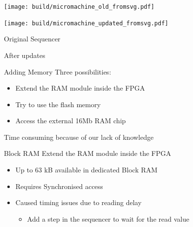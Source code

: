 \documentclass{beamer}
\begin{document}
      \begin{landscape}
        \begin{frame}[plain]
            \texttt{[image: build/micromachine\_old\_fromsvg.pdf]}

        \end{frame}
        \begin{frame}[plain]
            \texttt{[image: build/micromachine\_updated\_fromsvg.pdf]}

        \end{frame}
      \end{landscape}

      \begin{frame}{Original Sequencer}
          \begin{figure}
            \centering
          \end{figure}
      \end{frame}

      \begin{frame}{After updates}
        \begin{figure}
          \centering
        \end{figure}
      \end{frame}

      \begin{frame}{Adding Memory}
          Three possibilities:
          \begin{itemize}
            \item Extend the RAM module inside the FPGA
            \item Try to use the flash memory
            \item Access the external 16Mb RAM chip
        \end{itemize}

          Time consuming because of our lack of knowledge
      \end{frame}

      \begin{frame}{Block RAM}
        Extend the RAM module inside the FPGA
          \begin{itemize}
            \item Up to 63 kB available in dedicated Block RAM
            \item Requires Synchronised access
            \item Caused timing issues due to reading delay
                \begin{itemize}
                  \item Add a step in the sequencer to wait for the read value
                \end{itemize}
           \end{itemize}
      \end{frame}
\end{document}
